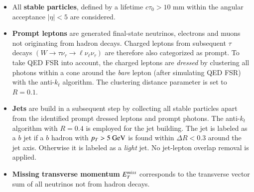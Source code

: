 \begin{itemize}
    \item All \textbf{stable particles}, defined by a lifetime $c\tau_0 > 10$ mm within the angular acceptance $|\eta| < 5$ are considered.
    \item \textbf{Prompt leptons} are generated final-state neutrinos, electrons and muons not originating from hadron decays.
    Charged leptons from subsequent $\tau$ decays $(W\rightarrow \tau\nu_\tau \rightarrow \ell\nu_\ell\nu_\tau)$ are therefore also categorized as prompt.
    To take QED FSR into account, the charged leptons are \textit{dressed} by clustering all photons within a cone around the \textit{bare} lepton (after simulating QED FSR) with the anti-$k_t$ algorithm. The clustering distance parameter is set to $R=0.1$.
    \item \textbf{Jets} are build in a subsequent step by collecting all stable particles apart from the identified prompt dressed leptons and prompt photons. The anti-$k_t$ algorithm with $R=0.4$ is employed for the jet building.
    The jet is labeled as a $b$ jet if a $b$ hadron with $p_T>5~\text{GeV}$ is found within $\Delta R < 0.3$ around the jet axis. Otherwise it is labeled as a \textit{light} jet. 
    No jet-lepton overlap removal is applied.
    \item \textbf{Missing transverse momentum} $E_T^{miss}$
    corresponds to the transverse vector sum of all neutrinos not from hadron decays.
\end{itemize}
